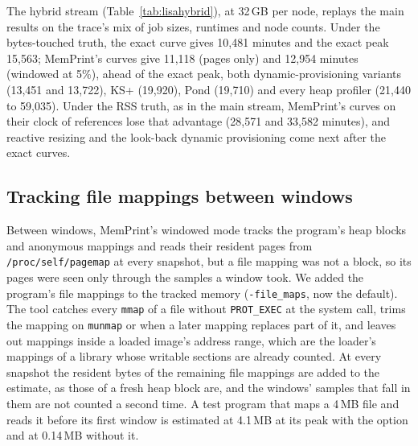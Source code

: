 \documentclass[11pt]{article}
\newcommand{\memprint}{MemPrint}
\newcommand{\tabref}[1]{Table~\ref{#1}}
\begin{document}
The hybrid stream (\tabref{tab:lisahybrid}), at 32\,GB per node, replays the main results on the trace's mix of
job sizes, runtimes and node counts. Under the bytes-touched truth, the exact curve gives 10{,}481 minutes and the
exact peak 15{,}563; \memprint{}'s curves give 11{,}118 (pages only) and 12{,}954 minutes (windowed at 5\%), ahead of
the exact peak, both dynamic-provisioning variants (13{,}451 and 13{,}722), KS+ (19{,}920), Pond (19{,}710) and every
heap profiler (21{,}440 to 59{,}035). Under the RSS truth, as in the main stream, \memprint{}'s curves on their
clock of references lose that advantage (28{,}571 and 33{,}582 minutes), and reactive resizing and the look-back
dynamic provisioning come next after the exact curves.

\subsection{Tracking file mappings between windows}
\label{sec:filemaps}

\begin{table}[t]
\centering
\caption{\memprint{}'s oracles before and after tracking file mappings between windows (\texttt{-file\_maps}):
mean response time (minutes) at load 0.8, calibrated 90\% margins, mean of three seeds. Only \memprint{}'s
windowed runs were repeated; every other oracle is unchanged.}
\label{tab:filemaps}

\end{table}

Between windows, \memprint{}'s windowed mode tracks the program's heap blocks and anonymous mappings and reads
their resident pages from \texttt{/proc/self/pagemap} at every snapshot, but a file mapping was not a block, so
its pages were seen only through the samples a window took. We added the program's file mappings to the tracked
memory (\texttt{-file\_maps}, now the default). The tool catches every \texttt{mmap} of a file without
\texttt{PROT\_EXEC} at the system call, trims the mapping on \texttt{munmap} or when a later mapping replaces part
of it, and leaves out mappings inside a loaded image's address range, which are the loader's mappings of a library
whose writable sections are already counted. At every snapshot the resident bytes of the remaining file mappings
are added to the estimate, as those of a fresh heap block are, and the windows' samples that fall in them are not
counted a second time. A test program that maps a 4\,MB file and reads it before its first window is estimated at
4.1\,MB at its peak with the option and at 0.14\,MB without it.
\end{document}
